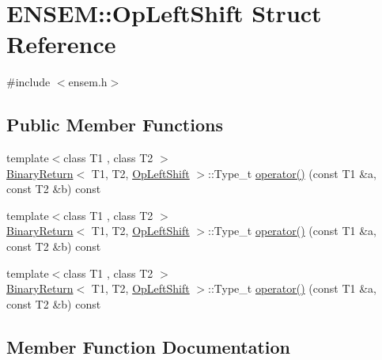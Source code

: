 \hypertarget{structENSEM_1_1OpLeftShift}{}\section{E\+N\+S\+EM\+:\+:Op\+Left\+Shift Struct Reference}
\label{structENSEM_1_1OpLeftShift}


{\ttfamily \#include $<$ensem.\+h$>$}

\subsection*{Public Member Functions}
\begin{DoxyCompactItemize}
\item 
{\footnotesize template$<$class T1 , class T2 $>$ }\\\mbox{\hyperlink{structENSEM_1_1BinaryReturn}{Binary\+Return}}$<$ T1, T2, \mbox{\hyperlink{structENSEM_1_1OpLeftShift}{Op\+Left\+Shift}} $>$\+::Type\+\_\+t \mbox{\hyperlink{structENSEM_1_1OpLeftShift_adf50631f48cb1f93f10fdb26256f19b6}{operator()}} (const T1 \&a, const T2 \&b) const
\item 
{\footnotesize template$<$class T1 , class T2 $>$ }\\\mbox{\hyperlink{structENSEM_1_1BinaryReturn}{Binary\+Return}}$<$ T1, T2, \mbox{\hyperlink{structENSEM_1_1OpLeftShift}{Op\+Left\+Shift}} $>$\+::Type\+\_\+t \mbox{\hyperlink{structENSEM_1_1OpLeftShift_adf50631f48cb1f93f10fdb26256f19b6}{operator()}} (const T1 \&a, const T2 \&b) const
\item 
{\footnotesize template$<$class T1 , class T2 $>$ }\\\mbox{\hyperlink{structENSEM_1_1BinaryReturn}{Binary\+Return}}$<$ T1, T2, \mbox{\hyperlink{structENSEM_1_1OpLeftShift}{Op\+Left\+Shift}} $>$\+::Type\+\_\+t \mbox{\hyperlink{structENSEM_1_1OpLeftShift_adf50631f48cb1f93f10fdb26256f19b6}{operator()}} (const T1 \&a, const T2 \&b) const
\end{DoxyCompactItemize}


\subsection{Member Function Documentation}
\mbox{\label{structENSEM_1_1OpLeftShift_adf50631f48cb1f93f10fdb26256f19b6}} 
